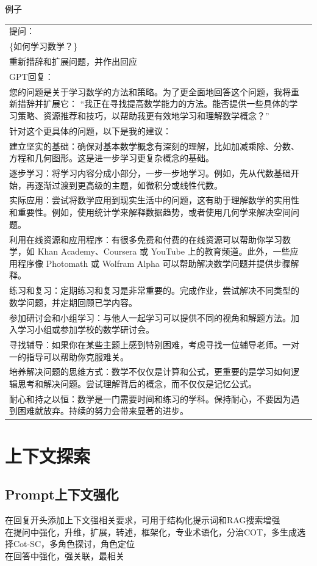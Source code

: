 \documentclass[12pt]{book}
\begin{document}
\bigskip
例子

\begin{tabular}{|p{15cm}|p{3cm}|}
	\hline
提问：\\
\{如何学习数学？\}\\
重新措辞和扩展问题，并作出回应\\

GPT回复：\\
您的问题是关于学习数学的方法和策略。为了更全面地回答这个问题，我将重新措辞并扩展它： “我正在寻找提高数学能力的方法。能否提供一些具体的学习策略、资源推荐和技巧，以帮助我更有效地学习和理解数学概念？”\\
针对这个更具体的问题，以下是我的建议：\\
建立坚实的基础：确保对基本数学概念有深刻的理解，比如加减乘除、分数、方程和几何图形。这是进一步学习更复杂概念的基础。\\
逐步学习：将学习内容分成小部分，一步一步地学习。例如，先从代数基础开始，再逐渐过渡到更高级的主题，如微积分或线性代数。\\
实际应用：尝试将数学应用到现实生活中的问题，这有助于理解数学的实用性和重要性。例如，使用统计学来解释数据趋势，或者使用几何学来解决空间问题。\\
利用在线资源和应用程序：有很多免费和付费的在线资源可以帮助你学习数学，如 Khan Academy、Coursera 或 YouTube 上的教育频道。此外，一些应用程序像 Photomath 或 Wolfram Alpha 可以帮助解决数学问题并提供步骤解释。\\
练习和复习：定期练习和复习是非常重要的。完成作业，尝试解决不同类型的数学问题，并定期回顾已学内容。\\
参加研讨会和小组学习：与他人一起学习可以提供不同的视角和解题方法。加入学习小组或参加学校的数学研讨会。\\
寻找辅导：如果你在某些主题上感到特别困难，考虑寻找一位辅导老师。一对一的指导可以帮助你克服难关。\\
培养解决问题的思维方式：数学不仅仅是计算和公式，更重要的是学习如何逻辑思考和解决问题。尝试理解背后的概念，而不仅仅是记忆公式。\\
耐心和持之以恒：数学是一门需要时间和练习的学科。保持耐心，不要因为遇到困难就放弃。持续的努力会带来显著的进步。\\

	\hline
\end{tabular}

\chapter{上下文探索}
\section{Prompt上下文强化}
在回复开头添加上下文强相关要求，可用于结构化提示词和RAG搜索增强\\
在提问中强化，升维，扩展，转述，框架化，专业术语化，分治COT，多生成选择Cot-SC，多角色探讨，角色定位\\
在回答中强化，强关联，最相关\\
\end{document}
